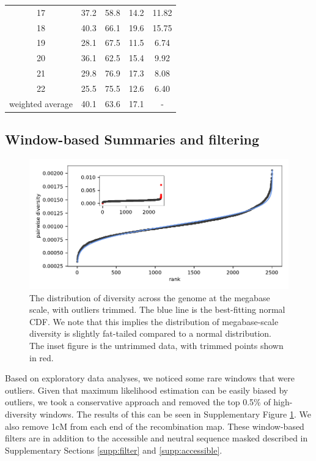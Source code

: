 \documentclass[11pt]{article}
\begin{document}
\begin{table}
\begin{tabular}{|c|cccc|}
17 &        37.2 &     58.8 &  14.2 &     11.82 \\
18 &        40.3 &     66.1 &  19.6 &     15.75 \\
19 &        28.1 &     67.5 &  11.5 &      6.74 \\
20 &        36.1 &     62.5 &  15.4 &      9.92 \\
21 &        29.8 &     76.9 &  17.3 &      8.08 \\
22 &        25.5 &     75.5 &  12.6 &      6.40 \\
\hline
weighted average & 40.1 & 63.6 & 17.1 & - \\
\hline
\end{tabular}
\end{table}

\subsection{Window-based Summaries and filtering}

\begin{figure}[!htb]
  \centering
  \includegraphics{figures/supplementary/diversity_trimming_dist.pdf}

  \caption{The distribution of diversity across the genome at the megabase
  scale, with outliers trimmed. The blue line is the best-fitting normal CDF.
  We note that this implies the distribution of megabase-scale diversity 
  is slightly fat-tailed compared to a normal distribution.
  The inset figure is the untrimmed data, with trimmed points shown in red. }
  \label{suppfig:trimming}
\end{figure}

Based on exploratory data analyses, we noticed some rare windows that were
outliers. Given that maximum likelihood estimation can be easily biased by
outliers, we took a conservative approach and removed the top 0.5\% of
high-diversity windows. The results of this can be seen in Supplementary
Figure \ref{suppfig:trimming}. We also remove 1cM from each end of the
recombination map. These window-based filters are in addition to the
accessible and neutral sequence masked described in Supplementary Sections
\ref{supp:filter} and \ref{supp:accessible}.
\end{document}
